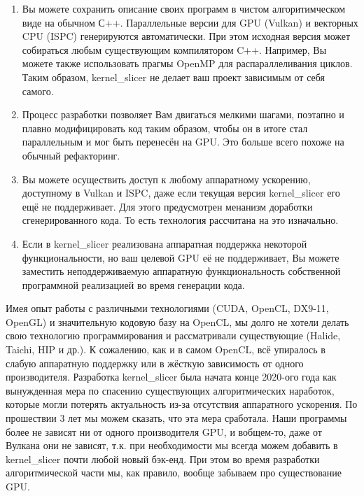 \documentclass[11pt,fleqn,english,russian]{report} %
\begin{document}
\begin{enumerate}

\item Вы можете сохранить описание своих программ в чистом алгоритимческом виде на обычном С++. Параллельные версии для GPU (Vulkan) и векторных CPU (ISPC) генерируются автоматически. При этом исходная версия может собираться любым существующим компилятором C++. Например, Вы можете также использовать прагмы OpenMP для распараллеливания циклов. Таким образом, kernel\_slicer не делает ваш проект зависимым от себя самого.

\item Процесс разработки позволяет Вам двигаться мелкими шагами, поэтапно и плавно модифицировать код таким образом, чтобы он в итоге стал параллельным и мог быть перенесён на GPU. Это больше всего похоже на обычный рефакторинг.

\item Вы можете осуществить доступ к любому аппаратному ускорению, доступному в Vulkan и ISPC, даже если текущая версия kernel\_slicer его ещё не поддерживает. Для этого предусмотрен менанизм доработки сгенерированного кода. То есть технология рассчитана на это изначально.

\item Если в kernel\_slicer реализована аппаратная поддержка некоторой функциональности, но ваш целевой GPU её не поддерживает, Вы можете заместить неподдерживаемую аппаратную функциональность собственной программной реализацией во время генерации кода.
\end{enumerate}

\begin{remark}Имея опыт работы с различными технологиями (CUDA, OpenCL, DX9-11, OpenGL) и значительную кодовую базу на OpenCL, мы долго не хотели делать свою технологию программирования и рассматривали существующие (Halide, Taichi, HIP и др.). К сожалению, как и в самом OpenCL, всё упиралось в слабую аппаратную поддержку или в жёсткую зависимость от одного производителя. Разработка kernel\_slicer была начата конце 2020-ого года как вынужденная мера по спасению существующих алгоритмических наработок, которые могли потерять актуальность из-за отсутствия аппаратного ускорения. По прошествии 3 лет мы можем сказать, что эта мера сработала. Наши программы более не зависят ни от одного производителя GPU, и вобщем-то, даже от Вулкана они не зависят, т.к. при необходимости мы всегда можем добавить в kernel\_slicer почти любой новый бэк-енд. При этом во время разработки алгоритмической части мы, как правило, вообще забываем про существование GPU.
\end{remark}
\end{document}
